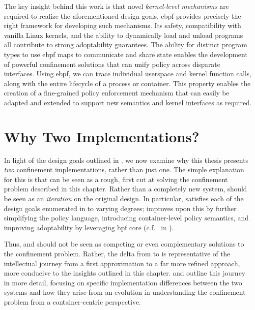 The key insight behind this work is that novel \textit{kernel-level mechanisms} are
required to realize the aforementioned design goals. \gls{ebpf} provides precisely the
right framework for developing such mechanisms. Its safety, compatibility with vanilla
Linux kernels, and the ability to dynamically load and unload programs all contribute to
strong adoptability guarantees. The ability for distinct program types to use \gls{ebpf}
maps to communicate and share state enables the development of powerful confinement
solutions that can unify policy across disparate interfaces. Using \gls{ebpf}, we can
trace individual userspace and kernel function calls, along with the entire lifecycle of
a process or container. This property enables the creation of a fine-grained policy
enforcement mechanism that can easily be adapted and extended to support new semantics and
kernel interfaces as required.



\section{Why Two Implementations?}
\label{s:cp-why-two}

In light of the design goals outlined in , we now examine why this
thesis presents \textit{two} confinement implementations, rather than just one. The simple
explanation for this is that \bpfbox{} can be seen as a rough, first cut at solving the
confinement problem described in this chapter. Rather than a completely new system,
\bpfcontain{} should be seen as an \textit{iteration} on the original \bpfbox{} design.
In particular, \bpfbox{} satisfies each of the design goals enumerated in
 to varying degrees; \bpfcontain{} improves upon this by further
simplifying the policy language, introducing container-level policy semantics, and
improving adoptability by leveraging \gls{bpf} \gls{core} (c.f.\  in
).

Thus, \bpfbox{} and \bpfcontain{} should not be seen as competing or even complementary
solutions to the confinement problem. Rather, the delta from \bpfbox{} to \bpfcontain{} is
representative of the intellectual journey from a first approximation to a far more
refined approach, more conducive to the insights outlined in this chapter. 
and  outline this journey in more detail, focusing on specific implementation
differences between the two systems and how they arise from an evolution in understanding
the confinement problem from a container-centric perspective.



